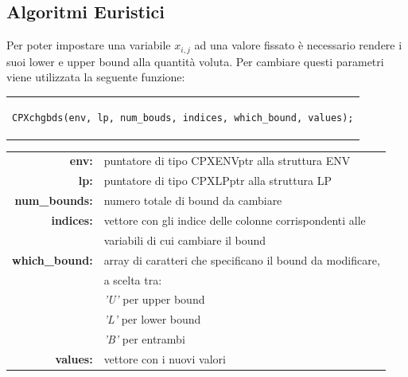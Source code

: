 \subsection{Algoritmi Euristici}
Per poter impostare una variabile $x_{i,j}$ ad una valore fissato è necessario rendere i suoi lower e upper bound alla quantità voluta. Per cambiare questi parametri viene utilizzata la seguente funzione: 
\begin{center}
\begin{tabular}{c}
\begin{lstlisting}[linewidth=365pt, basicstyle=\footnotesize\sffamily,]    
CPXchgbds(env, lp, num_bouds, indices, which_bound, values);
\end{lstlisting}
\end{tabular}
\end{center}
\begin{table}[h]
\centering
\begin{tabular}{rl}
\textbf{env:} & {puntatore di tipo CPXENVptr alla struttura ENV}\\
\textbf{lp:} & {puntatore di tipo CPXLPptr alla struttura LP}\\
\textbf{num\_bounds:} & {numero totale di bound da cambiare}\\
\textbf{indices:} & {vettore con gli indice delle colonne corrispondenti alle}\\
&{variabili di cui cambiare il bound}\\
\textbf{which\_bound:} & {array di caratteri che specificano il bound da modificare,}\\
&{a scelta tra:}\\
&{\textit{'U'} per upper bound}\\
&{\textit{'L'} per lower bound}\\
&{\textit{'B'} per entrambi}\\
\textbf{values:} & {vettore con i nuovi valori}\\
\end{tabular}
\end{table}
